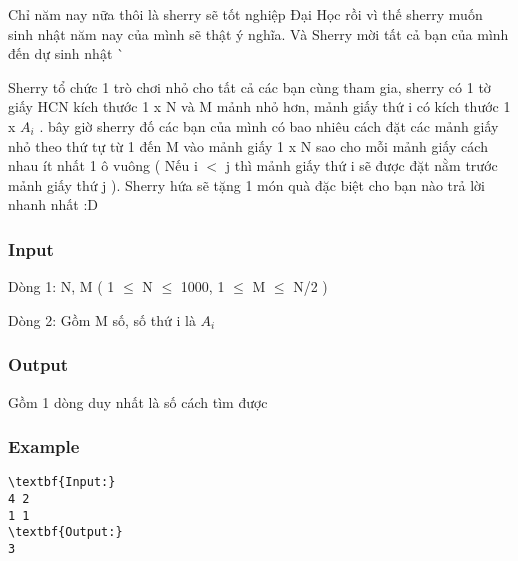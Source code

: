 



   Chỉ năm nay nữa thôi là sherry sẽ tốt nghiệp Đại Học rồi vì thế sherry muốn sinh nhật năm nay của mình sẽ thật ý nghĩa. Và Sherry mời tất cả bạn của mình đến dự sinh nhật ^^  

   Sherry tổ chức 1 trò chơi nhỏ cho tất cả các bạn cùng tham gia, sherry có 1 tờ giấy HCN kích thước 1 x N và M mảnh nhỏ hơn, mảnh giấy thứ i có kích thước 1 x $A_{i}$   . bây giờ sherry đố các bạn của mình có bao nhiêu cách đặt các mảnh giấy nhỏ theo thứ tự từ 1 đến M  vào mảnh giấy 1 x N sao cho mỗi mảnh giấy cách nhau ít nhất 1 ô vuông ( Nếu i $<$ j thì mảnh giấy thứ i sẽ được đặt nằm trước mảnh giấy thứ j ). Sherry hứa sẽ tặng 1 món quà đặc biệt cho bạn nào trả lời nhanh nhất :D  

\subsubsection{   Input  }

   Dòng 1: N, M ( 1  $\le$  N  $\le$  1000, 1  $\le$  M  $\le$  N/2 )  

   Dòng 2: Gồm M số, số  thứ  i  là   $A_{i}$

\subsubsection{   Output  }

   Gồm 1 dòng duy nhất là số cách tìm được  

\subsubsection{   Example  }
\begin{verbatim}
\textbf{Input:}
4 2
1 1
\textbf{Output:}
3
\end{verbatim}
